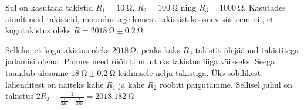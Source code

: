 
Sul on kasutada takistid $R_1=\SI{10}{\ohm}$, $R_2=\SI{100}{\ohm}$ ning $R_3=\SI{1000}{\ohm}$. Kasutades ainult neid takisteid, mooodustage kuuest takistist koosnev süsteem nii, et kogutakistus oleks $R=\SI{2018}{\ohm}\pm\SI{0,2}{\ohm}$.




\hint

\solu
Selleks, et kogutakistus oleks $\SI{2018}{\ohm}$, peaks kaks $R_3$ takistit ülejäänud takistitega jadamisi olema. Pannes need rööbiti muutuks takistus liiga väikseks. Seega taandub ülesanne $\SI{18}{\ohm}\pm\SI{0.2}{\ohm}$ leidmisele nelja takistiga. Üks sobilikest lahenditest on näiteks kahe $R_1$ ja kahe $R_2$ rööbiti paigutamine. Sellisel juhul on takistus $2R_3 + \frac{1}{\frac{1}{2R_1} + \frac{1}{2R_2}} = \SI{2018.182}{\ohm}$
\probend